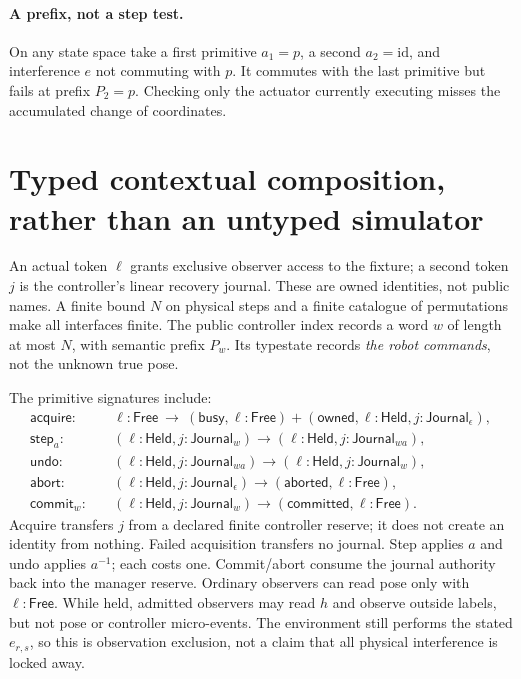 \documentclass[11pt]{article}
\newcommand{\id}{\mathrm{id}}
\begin{document}
\paragraph{A prefix, not a step test.}
On any state space take a first primitive $a_1=p$, a second $a_2=\id$, and interference $e$ not commuting with $p$. It commutes with the last primitive but fails at prefix $P_2=p$. Checking only the actuator currently executing misses the accumulated change of coordinates.

\section{Typed contextual composition, rather than an untyped simulator}
An actual token $\ell$ grants exclusive observer access to the fixture; a second token $j$ is the controller's linear recovery journal. These are owned identities, not public names. A finite bound $N$ on physical steps and a finite catalogue of permutations make all interfaces finite. The public controller index records a word $w$ of length at most $N$, with semantic prefix $P_w$. Its typestate records \emph{the robot commands}, not the unknown true pose.

The primitive signatures include:
\begin{align*}
 \mathsf{acquire}:&\quad \ell:\mathsf{Free}\ \longrightarrow\
       (\mathsf{busy},\ell:\mathsf{Free})
       +(\mathsf{owned},\ell:\mathsf{Held},j:\mathsf{Journal}_{\epsilon}),\\
 \mathsf{step}_a:&\quad (\ell:\mathsf{Held},j:\mathsf{Journal}_w)
       \longrightarrow (\ell:\mathsf{Held},j:\mathsf{Journal}_{wa}),\\
 \mathsf{undo}:&\quad (\ell:\mathsf{Held},j:\mathsf{Journal}_{wa})
       \longrightarrow (\ell:\mathsf{Held},j:\mathsf{Journal}_w),\\
 \mathsf{abort}:&\quad (\ell:\mathsf{Held},j:\mathsf{Journal}_{\epsilon})
       \longrightarrow (\mathsf{aborted},\ell:\mathsf{Free}),\\
 \mathsf{commit}_w:&\quad (\ell:\mathsf{Held},j:\mathsf{Journal}_w)
       \longrightarrow (\mathsf{committed},\ell:\mathsf{Free}).
\end{align*}
Acquire transfers $j$ from a declared finite controller reserve; it does not create an identity from nothing. Failed acquisition transfers no journal. Step applies $a$ and undo applies $a^{-1}$; each costs one. Commit/abort consume the journal authority back into the manager reserve. Ordinary observers can read pose only with $\ell:\mathsf{Free}$. While held, admitted observers may read $h$ and observe outside labels, but not pose or controller micro-events. The environment still performs the stated $e_{r,s}$, so this is observation exclusion, not a claim that all physical interference is locked away.
\end{document}
